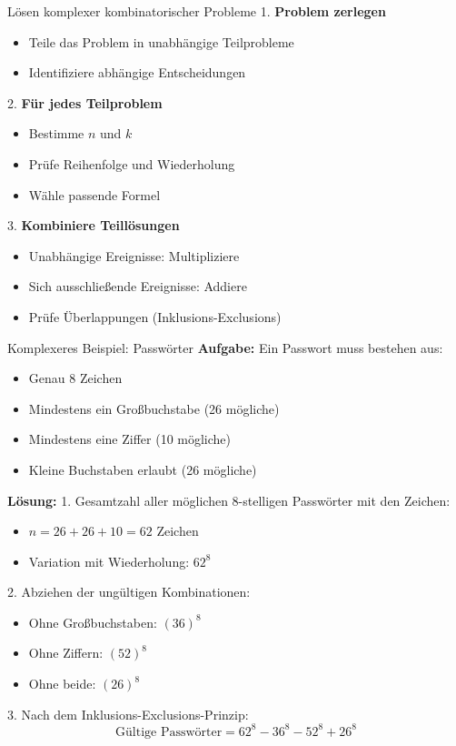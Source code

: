 \begin{KR}{Lösen komplexer kombinatorischer Probleme}
1. \textbf{Problem zerlegen}
   \begin{itemize}
   \item Teile das Problem in unabhängige Teilprobleme
   \item Identifiziere abhängige Entscheidungen
   \end{itemize}

2. \textbf{Für jedes Teilproblem}
   \begin{itemize}
   \item Bestimme $n$ und $k$
   \item Prüfe Reihenfolge und Wiederholung
   \item Wähle passende Formel
   \end{itemize}

3. \textbf{Kombiniere Teillösungen}
   \begin{itemize}
   \item Unabhängige Ereignisse: Multipliziere
   \item Sich ausschließende Ereignisse: Addiere
   \item Prüfe Überlappungen (Inklusions-Exclusions)
   \end{itemize}
\end{KR}

\begin{example2}{Komplexeres Beispiel: Passwörter}
\textbf{Aufgabe:} Ein Passwort muss bestehen aus:
\begin{itemize}
\item Genau 8 Zeichen
\item Mindestens ein Großbuchstabe (26 mögliche)
\item Mindestens eine Ziffer (10 mögliche)
\item Kleine Buchstaben erlaubt (26 mögliche)
\end{itemize}

\textbf{Lösung:}
1. Gesamtzahl aller möglichen 8-stelligen Passwörter mit den Zeichen:
   \begin{itemize}
   \item $n = 26 + 26 + 10 = 62$ Zeichen
   \item Variation mit Wiederholung: $62^8$
   \end{itemize}

2. Abziehen der ungültigen Kombinationen:
   \begin{itemize}
   \item Ohne Großbuchstaben: $(36)^8$
   \item Ohne Ziffern: $(52)^8$
   \item Ohne beide: $(26)^8$
   \end{itemize}

3. Nach dem Inklusions-Exclusions-Prinzip:
   \[ \text{Gültige Passwörter} = 62^8 - 36^8 - 52^8 + 26^8 \]
\end{example2}



